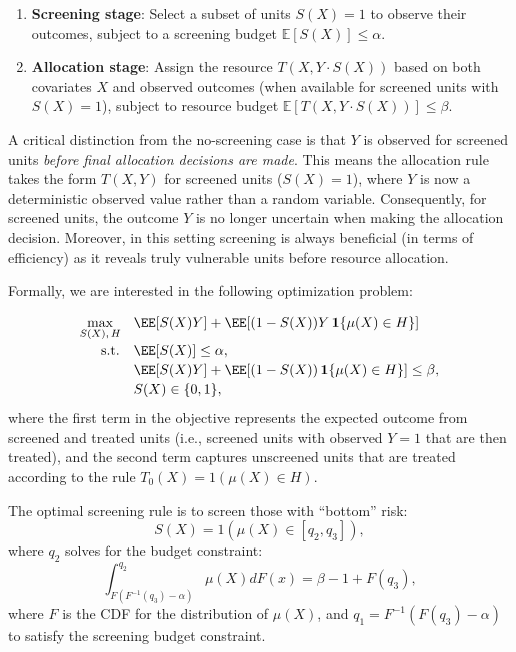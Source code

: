 \documentclass[11pt]{article}
\begin{document}
\begin{enumerate}
\item \textbf{Screening stage}: Select a subset of units $S(X) = 1$ to observe their outcomes, subject to a screening budget $\mathbb{E}[S(X)] \leq \alpha$.
\item \textbf{Allocation stage}: Assign the resource $T(X, Y \cdot S(X))$ based on both covariates $X$ and observed outcomes (when available for screened units with $S(X) = 1$), subject to  resource budget $\mathbb{E}[T(X, Y \cdot S(X))] \leq \beta$.
\end{enumerate}

A critical distinction from the no-screening case is that $Y$ is observed for screened units \textit{before final allocation decisions are made}. This means the allocation rule takes the form $T(X,Y)$ for screened units ($S(X) = 1$), where $Y$ is now a deterministic observed value rather than a random variable. Consequently, for screened units, the outcome $Y$ is no longer uncertain when making the allocation decision. Moreover, in this setting screening is always beneficial (in terms of efficiency) as it reveals truly vulnerable units before resource allocation.

Formally, we are interested in the following optimization problem:

\begin{align*}\label{opt}
\small
\max_{S(X),\, H} \quad 
    & \EE\!\left[ S(X) Y \right] 
      + \EE\!\left[(1-S(X)) Y\, \mathbf{1}\{\mu(X)\in H\}\right] \\[-2pt]
\text{s.t.}\quad
    & \EE[S(X)] \le \alpha, \\[-1pt]
    & \EE\!\left[ S(X) Y \right] 
      + \EE\!\left[(1-S(X))\, \mathbf{1}\{\mu(X)\in H\}\right] \le \beta, \\[-1pt]
    & S(X)\in\{0,1\},
\end{align*}
where the first term in the objective represents the expected outcome from screened and treated units (i.e., screened units with observed $Y=1$ that are then treated), and the second term captures unscreened units that are treated according to the rule $T_0(X) = 1(\mu(X) \in H)$.


\begin{theorem}
\label{thm:optimal_no_screening}
The optimal screening rule is to screen those with ``bottom'' risk:
$$S(X) = 1(\mu(X) \in [q_2, q_3]),$$ 
where $q_2$ solves for the budget constraint:
$$\int_{F(F^{-1}(q_3) - \alpha)}^{q_2} \mu(X) dF(x) = \beta - 1 + F(q_3),$$
where $F$ is the CDF for the distribution of $\mu(X)$, and $q_1 = F^{-1}(F(q_3) - \alpha)$ to satisfy the screening budget constraint.
\end{theorem}
\end{document}
